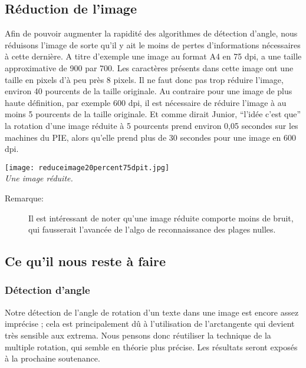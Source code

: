 \documentclass[a4paper,10pt]{report}
\begin{document}
\subsection{ R\'eduction de l'image }
 Afin de pouvoir augmenter la rapidit\'e des algorithmes de d\'etection
 d'angle, nous r\'eduisons l'image de sorte qu'il y ait le moins de
 pertes d'informations n\'ecessaires \`a cette derni\`ere. A titre
 d'exemple une image au format A4 en 75 dpi, a une taille approximative
 de 900 par 700. Les caract\`eres pr\'esents dans cette image ont une
 taille en pixels d'\`a peu pr\`es 8 pixels. Il ne faut donc pas trop
 r\'eduire l'image, environ 40 pourcents de la taille originale. Au
 contraire pour une image de plus haute d\'efinition, par exemple 600
 dpi, il est n\'ecessaire de r\'eduire l'image \`a au moins 5 pourcents
 de la taille originale. Et comme dirait Junior, ``l'id\'ee c'est
 que'' la rotation d'une image r\'eduite \`a 5 pourcents prend environ
 0,05 secondes sur les machines du PIE, alors qu'elle prend plus de 30
 secondes pour une image en 600 dpi.

\begin{center}
	
	\texttt{[image: reduceimage20percent75dpit.jpg]}\\
	\caption{\emph{Une image r\'eduite.}}
\end{center}


\begin{description}
	\item[Remarque:] Il est int\'eressant de noter qu'une image r\'eduite comporte
	moins de bruit, qui fausserait l'avanc\'ee de l'algo de reconnaissance
	des plages nulles.
\end{description}

\subsection{ Ce qu'il nous reste \`a faire}
\subsubsection{ D\'etection d'angle}
Notre d\'etection de l'angle de rotation d'un texte dans une image est
encore assez impr\'ecise ; cela est principalement d\^u \`a l'utilisation
de l'arctangente qui devient tr\`es sensible aux extrema. Nous pensons
donc r\'eutiliser la technique de la multiple rotation, qui semble en
th\'eorie plus pr\'ecise. Les r\'esultats seront expos\'es \`a la
prochaine soutenance.
\end{document}
